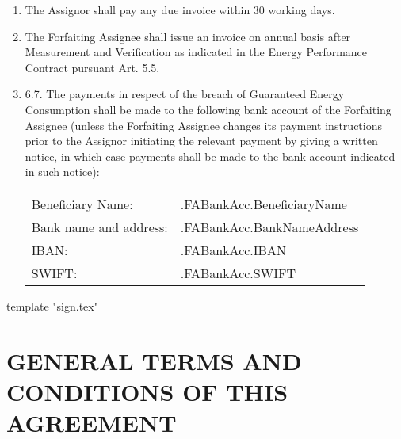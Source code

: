 \documentclass[a4paper]{article}
\begin{document}
\begin{enumerate}
\item{The Assignor shall pay any due invoice within 30 working days.}

\item{The Forfaiting Assignee shall issue an invoice on annual basis
    after Measurement and Verification as indicated in the Energy
    Performance Contract pursuant Art. 5.5.}

\item{6.7. The payments in respect of the breach of Guaranteed Energy
    Consumption shall be made to the following bank account of the
    Forfaiting Assignee (unless the Forfaiting Assignee changes its
    payment instructions prior to the Assignor initiating the relevant
    payment by giving a written notice, in which case payments shall
    be made to the bank account indicated in such notice):

    \begin{tabu}{XX[2]}
      Beneficiary Name: 	& 	{{.FABankAcc.BeneficiaryName}} 	\\
      Bank name and address: 	& 	{{.FABankAcc.BankNameAddress}} 	\\
      IBAN:			& 	{{.FABankAcc.IBAN}} 		\\
      SWIFT:			& 	{{.FABankAcc.SWIFT}} 		\\
    \end{tabu}}

\end{enumerate}

{{template "sign.tex"}}

\section{GENERAL TERMS AND CONDITIONS OF THIS AGREEMENT}
\end{document}
